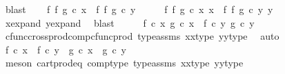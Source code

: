 \begin{isabellebody}
\ blast\isanewline
\isanewline
\ \ \isamarkupfalse%
\ {\isachardoublequoteopen}{\isacharparenleft}{\kern0pt}f\ {\isasymtimes}\isactrlsub f\ g{\isacharparenright}{\kern0pt}\ {\isasymcirc}\isactrlsub c\ x\ {\isacharequal}{\kern0pt}\ {\isacharparenleft}{\kern0pt}f\ {\isasymtimes}\isactrlsub f\ g{\isacharparenright}{\kern0pt}\ {\isasymcirc}\isactrlsub c\ y{\isachardoublequoteclose}\isanewline
\ \ \isamarkupfalse%
\ \isamarkupfalse%
\ {\isachardoublequoteopen}{\isacharparenleft}{\kern0pt}f\ {\isasymtimes}\isactrlsub f\ g{\isacharparenright}{\kern0pt}\ {\isasymcirc}\isactrlsub c\ {\isasymlangle}x{}{\isacharcomma}{\kern0pt}\ x{}{\isasymrangle}\ {\isacharequal}{\kern0pt}\ {\isacharparenleft}{\kern0pt}f\ {\isasymtimes}\isactrlsub f\ g{\isacharparenright}{\kern0pt}\ {\isasymcirc}\isactrlsub c\ {\isasymlangle}y{}{\isacharcomma}{\kern0pt}\ y{}{\isasymrangle}{\isachardoublequoteclose}\isanewline
\ \ \ \ \isamarkupfalse%
\ x{\isacharunderscore}{\kern0pt}expand\ y{\isacharunderscore}{\kern0pt}expand\ \isamarkupfalse%
\ blast\isanewline
\ \ \isamarkupfalse%
\ \isamarkupfalse%
\ {\isachardoublequoteopen}{\isasymlangle}f\ {\isasymcirc}\isactrlsub c\ x{}{\isacharcomma}{\kern0pt}\ g\ {\isasymcirc}\isactrlsub c\ x{}{\isasymrangle}\ {\isacharequal}{\kern0pt}\ {\isasymlangle}f\ {\isasymcirc}\isactrlsub c\ y{}{\isacharcomma}{\kern0pt}\ g\ {\isasymcirc}\isactrlsub c\ y{}{\isasymrangle}{\isachardoublequoteclose}\isanewline
\ \ \ \ \isamarkupfalse%
\ cfunc{\isacharunderscore}{\kern0pt}cross{\isacharunderscore}{\kern0pt}prod{\isacharunderscore}{\kern0pt}comp{\isacharunderscore}{\kern0pt}cfunc{\isacharunderscore}{\kern0pt}prod\ type{\isacharunderscore}{\kern0pt}assms\ x{}{\isacharunderscore}{\kern0pt}x{}{\isacharunderscore}{\kern0pt}type\ y{}{\isacharunderscore}{\kern0pt}y{}{\isacharunderscore}{\kern0pt}type\ \isamarkupfalse%
\ auto\isanewline
\ \ \isamarkupfalse%
\ \isamarkupfalse%
\ {\isachardoublequoteopen}f\ {\isasymcirc}\isactrlsub c\ x{}\ {\isacharequal}{\kern0pt}\ f\ {\isasymcirc}\isactrlsub c\ y{}\ {\isasymand}\ g\ {\isasymcirc}\isactrlsub c\ x{}\ {\isacharequal}{\kern0pt}\ g\ {\isasymcirc}\isactrlsub c\ y{}{\isachardoublequoteclose}\isanewline
\ \ \ \ \isamarkupfalse%
\ {\isacharparenleft}{\kern0pt}meson\ cart{\isacharunderscore}{\kern0pt}prod{\isacharunderscore}{\kern0pt}eq{}\ comp{\isacharunderscore}{\kern0pt}type\ type{\isacharunderscore}{\kern0pt}assms\ x{}{\isacharunderscore}{\kern0pt}x{}{\isacharunderscore}{\kern0pt}type\ y{}{\isacharunderscore}{\kern0pt}y{}{\isacharunderscore}{\kern0pt}type{\isacharparenright}{\kern0pt}\isanewline

\end{isabellebody}
